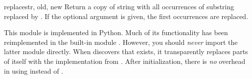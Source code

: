 \begin{funcdesc}{replace}{str, old, new}
  Return a copy of string  with all occurrences of substring
   replaced by .  If the optional argument
   is given, the first  occurrences are
  replaced.
\end{funcdesc}

This module is implemented in Python.  Much of its functionality has
been reimplemented in the built-in module
.  However, you
should \emph{never} import the latter module directly.  When
 discovers that  exists, it transparently
replaces parts of itself with the implementation from .
After initialization, there is \emph{no} overhead in using
 instead of .
